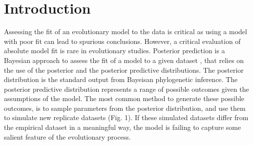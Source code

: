 %

\section{Introduction}
Assessing the fit of an evolutionary model to the data is critical as using a model with poor fit can lead to 
spurious conclusions. However, a critical evaluation of absolute model fit is rare in evolutionary studies.
Posterior prediction is a Bayesian approach to assess the fit of a model to a given dataset \citep{Bollback2002-ki,Brown2014-jl,Gelman2014-ay},
that relies on the use of the posterior and the posterior predictive distributions. 
The posterior distribution is the standard output from Bayeisan phylogenetic inference. The posterior predictive 
distribution represents a range of possible outcomes given the assumptions of the model. The most common method to 
generate these possible outcomes, is to sample parameters from the posterior distribution, and use them 
to simulate new replicate datasets (Fig. 1). If these simulated datasets differ from the empirical dataset in a
meaningful way, the model is failing to capture some salient feature of the evolutionary process. 

